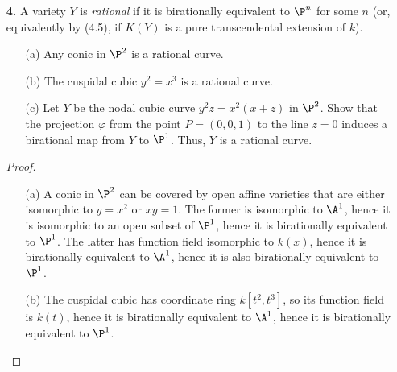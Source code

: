 \documentclass[a4paper]{article}
\begin{document}
\begin{enumerate} [label=\textbf{\arabic*.}, leftmargin=0cm]
\begin{proof}
    If $\varphi : X \to Y$ is a rational map, then the set of open subsets of $X$ on which $\varphi$ is represented by morphism function is nonempty, and since $X$ is a noetherian space, there is a maximal element in this set. Then, the largest open subset $U$ of $X$ on which $\varphi$ is represented by a morphism is the union of maximal elements in this subset of open subsets.
\end{proof}

\item[\textbf{4.}] A variety $Y$ is \textit{rational} if it is birationally equivalent to $\P^n$ for some $n$ (or, equivalently by (4.5), if $K(Y)$ is a pure transcendental extension of $k$).
\begin{itemize}
    \item[(a)] Any conic in $\P^2$ is a rational curve.
    \item[(b)] The cuspidal cubic $y^2 = x^3$ is a rational curve.
    \item[(c)] Let $Y$ be the nodal cubic curve $y^2 z = x^2(x + z)$ in $\P^2$. Show that the projection $\varphi$ from the point $P = (0, 0, 1)$ to the line $z = 0$ induces a birational map from $Y$ to $\P^1$. Thus, $Y$ is a rational curve.
\end{itemize}

\begin{proof} $ $ \vspace{0pt}
    \begin{itemize} [leftmargin=0cm]
        \item[(a)] A conic in $\P^2$ can be covered by open affine varieties that are either isomorphic to $y = x^2$ or $xy = 1$.
        The former is isomorphic to $\A^1$, hence it is isomorphic to an open subset of $\P^1$, hence it is birationally equivalent to $\P^1$.
        The latter has function field isomorphic to $k(x)$, hence it is birationally equivalent to $\A^1$, hence it is also birationally equivalent to $\P^1$.

        \item[(b)] The cuspidal cubic has coordinate ring $k[t^2, t^3]$, so its function field is $k(t)$, hence it is birationally equivalent to $\A^1$, hence it is birationally equivalent to $\P^1$.


\end{itemize}
\end{proof}
\end{enumerate}
\end{document}

